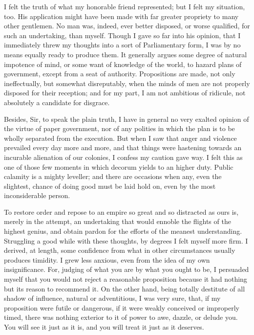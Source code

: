 I felt the truth of what my honorable friend represented; but I felt my situation, too. His application might have been made with far greater propriety to many other gentlemen. No man was, indeed, ever better disposed, or worse qualified, for such an undertaking, than myself. Though I gave so far into his opinion, that I immediately threw my thoughts into a sort of Parliamentary form, I was by no means equally ready to produce them. It generally argues some degree of natural impotence of mind, or some want of knowledge of the world, to hazard plans of government, except from a seat of authority. Propositions are made, not only ineffectually, but somewhat disreputably, when the minds of men are not properly disposed for their reception; and for my part, I am not ambitious of ridicule, not absolutely a candidate for disgrace.

Besides, Sir, to speak the plain truth, I have in general no very exalted opinion of the virtue of paper government, nor of any polities in which the plan is to be wholly separated from the execution. But when I saw that anger and violence prevailed every day more and more, and that things were hastening towards an incurable alienation of our colonies, I confess my caution gave way. I felt this as one of those few moments in which decorum yields to an higher duty. Public calamity is a mighty leveller; and there are occasions when any, even the slightest, chance of doing good must be laid hold on, even by the most inconsiderable person.

To restore order and repose to an empire so great and so distracted as ours is, merely in the attempt, an undertaking that would ennoble the flights of the highest genius, and obtain pardon for the efforts of the meanest understanding. Struggling a good while with these thoughts, by degrees I felt myself more firm. I derived, at length, some confidence from what in other circumstances usually produces timidity. I grew less anxious, even from the idea of my own insignificance. For, judging of what you are by what you ought to be, I persuaded myself that you would not reject a reasonable proposition because it had nothing but its reason to recommend it. On the other hand, being totally destitute of all shadow of influence, natural or adventitious, I was very sure, that, if my proposition were futile or dangerous, if it were weakly conceived or improperly timed, there was nothing exterior to it of power to awe, dazzle, or delude you. You will see it just as it is, and you will treat it just as it deserves.

